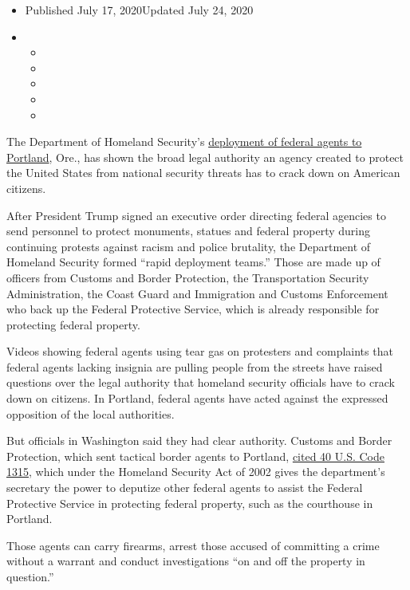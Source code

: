 \begin{itemize}
\item
  Published July 17, 2020Updated July 24, 2020
\item
  \begin{itemize}
  \item
  \item
  \item
  \item
  \item
  \end{itemize}
\end{itemize}

The Department of Homeland Security's
\href{https://www.nytimes.com/2020/07/20/us/politics/portland-federal-agents-trump.html}{deployment
of federal agents to Portland}, Ore., has shown the broad legal
authority an agency created to protect the United States from national
security threats has to crack down on American citizens.

After President Trump signed an executive order directing federal
agencies to send personnel to protect monuments, statues and federal
property during continuing protests against racism and police brutality,
the Department of Homeland Security formed ``rapid deployment teams.''
Those are made up of officers from Customs and Border Protection, the
Transportation Security Administration, the Coast Guard and Immigration
and Customs Enforcement who back up the Federal Protective Service,
which is already responsible for protecting federal property.

Videos showing federal agents using tear gas on protesters and
complaints that federal agents lacking insignia are pulling people from
the streets have raised questions over the legal authority that homeland
security officials have to crack down on citizens. In Portland, federal
agents have acted against the expressed opposition of the local
authorities.

But officials in Washington said they had clear authority. Customs and
Border Protection, which sent tactical border agents to Portland,
\href{https://www.law.cornell.edu/uscode/text/40/1315}{cited 40 U.S.
Code 1315}, which under the Homeland Security Act of 2002 gives the
department's secretary the power to deputize other federal agents to
assist the Federal Protective Service in protecting federal property,
such as the courthouse in Portland.

Those agents can carry firearms, arrest those accused of committing a
crime without a warrant and conduct investigations ``on and off the
property in question.''

